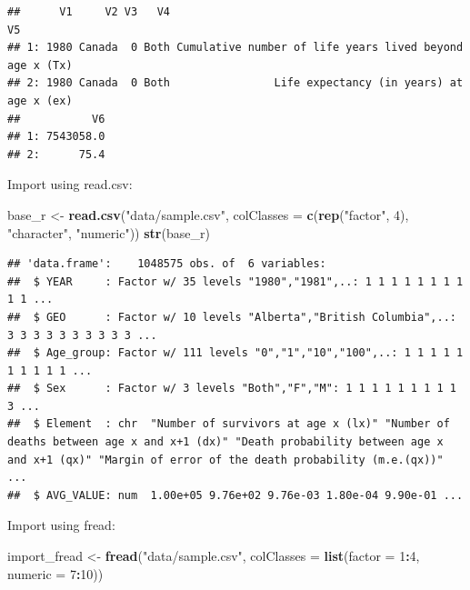 \documentclass[]{book}
\newenvironment{Shaded}{\begin{snugshade}}{\end{snugshade}}
\newcommand{\DataTypeTok}[1]{\textcolor[rgb]{0.13,0.29,0.53}{#1}}
\newcommand{\DecValTok}[1]{\textcolor[rgb]{0.00,0.00,0.81}{#1}}
\newcommand{\KeywordTok}[1]{\textcolor[rgb]{0.13,0.29,0.53}{\textbf{#1}}}
\newcommand{\NormalTok}[1]{#1}
\newcommand{\OperatorTok}[1]{\textcolor[rgb]{0.81,0.36,0.00}{\textbf{#1}}}
\newcommand{\StringTok}[1]{\textcolor[rgb]{0.31,0.60,0.02}{#1}}
\begin{document}
\begin{verbatim}
##      V1     V2 V3   V4                                                      V5
## 1: 1980 Canada  0 Both Cumulative number of life years lived beyond age x (Tx)
## 2: 1980 Canada  0 Both                Life expectancy (in years) at age x (ex)
##           V6
## 1: 7543058.0
## 2:      75.4
\end{verbatim}

Import using read.csv:

\begin{Shaded}
\begin{Highlighting}[]
\NormalTok{base_r <-}\StringTok{ }\KeywordTok{read.csv}\NormalTok{(}\StringTok{"data/sample.csv"}\NormalTok{, }
                   \DataTypeTok{colClasses =} \KeywordTok{c}\NormalTok{(}\KeywordTok{rep}\NormalTok{(}\StringTok{"factor"}\NormalTok{, }\DecValTok{4}\NormalTok{), }
                                  \StringTok{"character"}\NormalTok{, }
                                  \StringTok{"numeric"}\NormalTok{))}
\KeywordTok{str}\NormalTok{(base_r)}
\end{Highlighting}
\end{Shaded}

\begin{verbatim}
## 'data.frame':	1048575 obs. of  6 variables:
##  $ YEAR     : Factor w/ 35 levels "1980","1981",..: 1 1 1 1 1 1 1 1 1 1 ...
##  $ GEO      : Factor w/ 10 levels "Alberta","British Columbia",..: 3 3 3 3 3 3 3 3 3 3 ...
##  $ Age_group: Factor w/ 111 levels "0","1","10","100",..: 1 1 1 1 1 1 1 1 1 1 ...
##  $ Sex      : Factor w/ 3 levels "Both","F","M": 1 1 1 1 1 1 1 1 1 3 ...
##  $ Element  : chr  "Number of survivors at age x (lx)" "Number of deaths between age x and x+1 (dx)" "Death probability between age x and x+1 (qx)" "Margin of error of the death probability (m.e.(qx))" ...
##  $ AVG_VALUE: num  1.00e+05 9.76e+02 9.76e-03 1.80e-04 9.90e-01 ...
\end{verbatim}

Import using fread:

\begin{Shaded}
\begin{Highlighting}[]
\NormalTok{import_fread <-}\StringTok{ }\KeywordTok{fread}\NormalTok{(}\StringTok{"data/sample.csv"}\NormalTok{, }
                      \DataTypeTok{colClasses =} \KeywordTok{list}\NormalTok{(}\DataTypeTok{factor =} \DecValTok{1}\OperatorTok{:}\DecValTok{4}\NormalTok{, }\DataTypeTok{numeric =} \DecValTok{7}\OperatorTok{:}\DecValTok{10}\NormalTok{))}
\end{Highlighting}
\end{Shaded}
\end{document}
